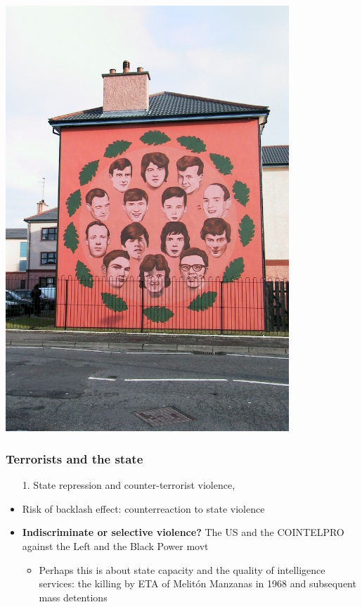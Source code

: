 \documentclass[aspectratio=43]{beamer}
\begin{document}
\begin{frame}
\begin{minipage}{0.49\textwidth}
\includegraphics[width = 0.8\textwidth]{img/bloody-sunday-mural}
\end{minipage}

\end{frame}

\begin{frame}
\frametitle{Terrorists and the state}
\centering

\begin{itemize}
  \item[1.] State repression and counter-terrorist violence, {\color{red}{does it work?}}
  \item Risk of backlash effect: counterreaction to state violence
  \item \textbf{Indiscriminate or selective violence?} The US and the COINTELPRO against the Left and the Black Power movt
  \begin{itemize}
    \item<2-> Perhaps this is about state capacity and the quality of intelligence services: the killing by ETA of Melitón Manzanas in 1968 and subsequent mass detentions
  \end{itemize}
\end{itemize}

\end{frame}
\end{document}
